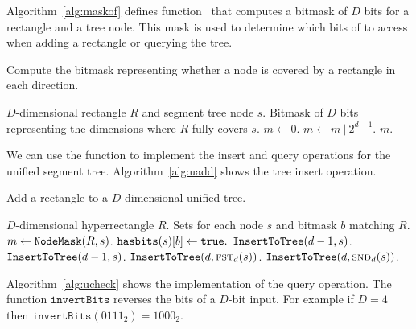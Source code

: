 \documentclass[english,gradu]{tktltiki2018}
\begin{document}
Algorithm~\ref{alg:maskof} defines function~\maskof{} that computes a bitmask of $D$ bits for a rectangle and a tree node.
This mask is used to determine which bits of  to access when adding a rectangle or querying the tree.

\begin{algorithm}
\caption{Compute the bitmask representing whether a node is covered by a rectangle in each direction.}\label{alg:maskof}
\begin{algorithmic}
\Require $D$-dimensional rectangle $R$ and segment tree node $s$.
\Output Bitmask of $D$ bits representing the dimensions where $R$ fully covers $s$.
	\State $m\gets 0$.
			\State $m\gets m\ |\ 2^{d-1}$.
		\EndIf
	\EndFor
	\State \Return $m$.
\EndProcedure
\end{algorithmic}
\end{algorithm}

We can use the \maskoff function to implement the insert and query operations for the unified segment tree.
Algorithm~\ref{alg:uadd} shows the tree insert operation.

\begin{algorithm}
\caption{Add a rectangle to a $D$-dimensional unified tree.}\label{alg:uadd}
\begin{algorithmic}
\Require $D$-dimensional hyperrectangle $R$.
\Ensure Sets  for each node $s$ and bitmask $b$ matching $R$.
		\State $m\gets\texttt{NodeMask}(R,s)$.
				\State $\texttt{hasbits}(s)[b]\gets\texttt{true}.$
			\EndIf
		\EndFor
		\State $\texttt{InsertToTree}(d-1,s)$.
		\State $\texttt{InsertToTree}(d-1,s)$.
		\State $\texttt{InsertToTree}(d,\textsc{fst}_{d}(s))$.
		\State $\texttt{InsertToTree}(d,\textsc{snd}_{d}(s))$.
	\EndIf
\EndProcedure
\end{algorithmic}
\end{algorithm}

Algorithm~\ref{alg:ucheck} shows the implementation of the query operation.
The function $\texttt{invertBits}$ reverses the bits of a $D$-bit input.
For example if $D=4$ then $\texttt{invertBits}(0111_2)=1000_2$.
\end{document}

